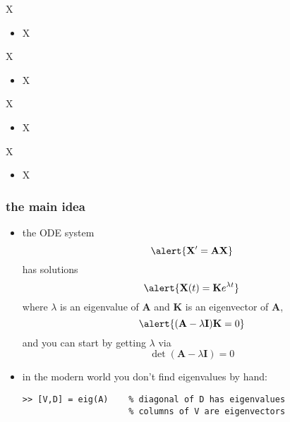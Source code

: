 \documentclass[urlcolor=blue,dvipsnames]{beamer}
\newcommand{\bA}{\mathbf{A}}
\newcommand{\bI}{\mathbf{I}}
\newcommand{\bK}{\mathbf{K}}
\newcommand{\bX}{\mathbf{X}}
\begin{document}
\begin{frame}{X}

\begin{itemize}
\item X
\end{itemize}
\end{frame}


\begin{frame}{X}

\begin{itemize}
\item X
\end{itemize}
\end{frame}


\begin{frame}{X}

\begin{itemize}
\item X
\end{itemize}
\end{frame}


\begin{frame}{X}

\begin{itemize}
\item X
\end{itemize}
\end{frame}


\begin{frame}[fragile]
\frametitle{the main idea}

\begin{itemize}
\item the ODE system
    $$\alert{\bX' = \bA \bX}$$
has solutions
    $$\alert{\bX(t) = \bK e^{\lambda t}}$$
where $\lambda$ is an eigenvalue of $\bA$ and $\bK$ is an eigenvector of $\bA$,
    $$\alert{(\bA-\lambda \bI) \bK = 0}$$
and you can start by getting $\lambda$ via
    $$\det(\bA - \lambda \bI) = 0$$
\item in the modern world you don't find eigenvalues by hand:
\begin{Verbatim}[fontsize=\small]
>> [V,D] = eig(A)    % diagonal of D has eigenvalues
                     % columns of V are eigenvectors
\end{Verbatim}
\end{itemize}
\end{frame}
\end{document}
